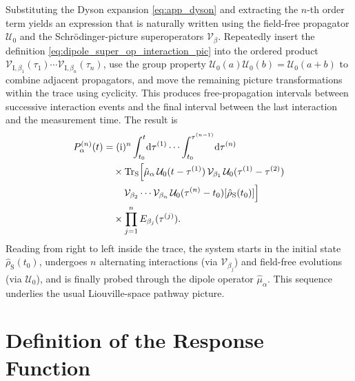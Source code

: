 Substituting the Dyson expansion \autoref{eq:app_dyson} and extracting the $n$-th order term yields an expression that is naturally written using the field-free propagator $\mathcal{U}_0$ and the Schr\"odinger-picture superoperators $\mathcal{V}_\beta$. Repeatedly insert the definition \autoref{eq:dipole_super_op_interaction_pic} into the ordered product
$\mathcal{V}_{\mathrm I,\beta_1}(\tau_1)\cdots \mathcal{V}_{\mathrm I,\beta_n}(\tau_n)$,
use the group property $\mathcal{U}_0(a)\mathcal{U}_0(b)=\mathcal{U}_0(a+b)$ to combine adjacent propagators, and move the remaining picture transformations within the trace using cyclicity. This produces free-propagation intervals between successive interaction events and the final interval between the last interaction and the measurement time. The result is
\begin{equation}
\begin{split}
P^{(n)}_\alpha(t)
&= (\mathrm{i})^n
\int_{t_0}^{t}\!\mathrm{d}\tau^{(1)}\cdots
\int_{t_0}^{\tau^{(n-1)}}\!\mathrm{d}\tau^{(n)}
\\
&\quad \times
\mathrm{Tr}_{\mathrm{S}}\Bigl[
\hat{\mu}_\alpha
\,\mathcal{U}_0(t-\tau^{(1)})
\,\mathcal{V}_{\beta_1}
\,\mathcal{U}_0(\tau^{(1)}-\tau^{(2)})
\\
&\qquad
\,\mathcal{V}_{\beta_2}
\cdots
\mathcal{V}_{\beta_n}
\,\mathcal{U}_0(\tau^{(n)}-t_0)
[\hat{\rho}_{\mathrm{S}}(t_0)]
\Bigr]
\\
&\quad \times
\prod_{j=1}^{n} E_{\beta_j}(\tau^{(j)}).
\end{split}
\label{eq:app_Pn_explicit}
\end{equation}
Reading from right to left inside the trace, the system starts in the initial state $\hat{\rho}_{\mathrm{S}}(t_0)$, undergoes $n$ alternating interactions (via $\mathcal{V}_{\beta_j}$) and field-free evolutions (via $\mathcal{U}_0$), and is finally probed through the dipole operator $\hat{\mu}_\alpha$. This sequence underlies the usual Liouville-space pathway picture.

\section{Definition of the Response Function}
\label{app:sec:response_function_definition}

